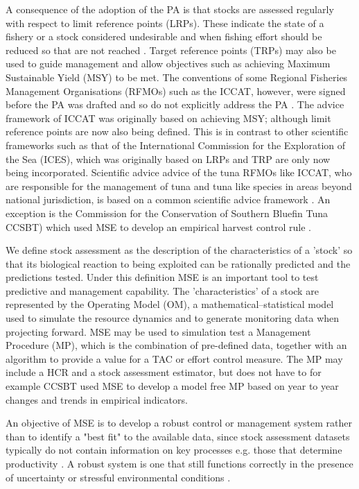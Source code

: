 \documentclass[%
nonumbib,      %
%
]{nrc1}                          %
\begin{document}
A consequence of the adoption of the PA is that stocks are assessed regularly with respect to limit reference points (LRPs). These indicate the state of a fishery or a stock considered undesirable and when fishing effort should be reduced so that are not reached \citep{gabriel1999review}. Target reference points (TRPs) may also be used to guide management and allow objectives such as achieving Maximum Sustainable Yield (MSY) to be met. The conventions of some Regional Fisheries Management Organisations (RFMOs) such as the ICCAT, however, were signed before the PA was drafted and so do not explicitly address the PA \citep{de2012precautionary}. The advice framework of ICCAT was originally based on achieving MSY; although limit reference points are now also being defined. This is in contrast to other scientific frameworks such as that of the International Commission for the Exploration of the Sea (ICES), which was originally based on LRPs and TRP are only now being incorporated. Scientific advice advice of the tuna RFMOs like ICCAT, who are responsible for the management of tuna and tuna like species in areas beyond national jurisdiction, is based on a common scientific advice framework \citep{kell2015kobe}. An exception is the Commission for the Conservation of Southern Bluefin Tuna CCSBT) which used MSE to develop an empirical harvest control rule \citep{hillary2015scientific}. 

We define stock assessment as the description of the characteristics of a 'stock' so that its biological reaction to being exploited can be rationally predicted and the predictions tested. Under this definition MSE is an important tool to test predictive and management capability. The 'characteristics' of a stock are represented by the Operating Model (OM), a mathematical–statistical model used to simulate the resource dynamics and to generate monitoring data when projecting forward. MSE may be used to simulation test a Management Procedure (MP), which is the combination of pre-defined data, together with an algorithm to provide a value for a TAC or effort control measure. The MP may include a HCR and a stock assessment estimator, but does not have to for example CCSBT used MSE to develop a model free MP based on year to year changes and trends in empirical indicators. 

An objective of MSE is to develop a robust control or management system rather than to identify a "best fit" to the available data, since stock assessment datasets typically do not contain information on key processes e.g. those that determine productivity \citep{kell2015srp}.  A robust system is one that still functions correctly in the presence of uncertainty or stressful environmental conditions \citep{radatz1990ieee}. 
\end{document}
